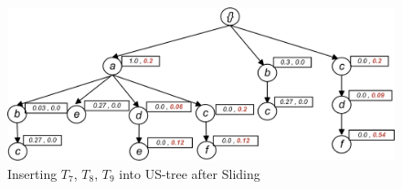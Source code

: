 %
%
\begin{figure}
  \centering
	\includegraphics[width=.8\textwidth]{images/sim_789.jpg}  
	\caption{Inserting $T_7$, $T_8$, $T_9$ into US-tree after Sliding}
	\label{figure:w2}
\end{figure}
%